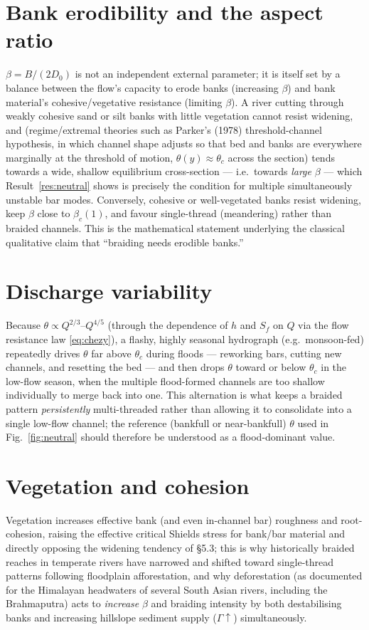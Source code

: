 \documentclass[11pt,a4paper]{report}
\theoremstyle{definition}
\theoremstyle{plain}
\theoremstyle{remark}
\begin{document}
\section{Bank erodibility and the aspect ratio}
$\beta=B/(2D_0)$ is not an independent external parameter; it is itself set by a balance between the flow's capacity to erode banks (increasing $\beta$) and bank material's cohesive/vegetative resistance (limiting $\beta$). A river cutting through weakly cohesive sand or silt banks with little vegetation cannot resist widening, and (regime/extremal theories such as Parker's (1978) threshold-channel hypothesis, in which channel shape adjusts so that bed and banks are everywhere marginally at the threshold of motion, $\theta(y)\approx\theta_c$ across the section) tends towards a wide, shallow equilibrium cross-section — i.e.\ towards \emph{large} $\beta$ — which Result~\ref{res:neutral} shows is precisely the condition for multiple simultaneously unstable bar modes. Conversely, cohesive or well-vegetated banks resist widening, keep $\beta$ close to $\beta_c(1)$, and favour single-thread (meandering) rather than braided channels. This is the mathematical statement underlying the classical qualitative claim that ``braiding needs erodible banks.''

\section{Discharge variability}
Because $\theta\propto Q^{2/3}$--$Q^{4/5}$ (through the dependence of $h$ and $S_f$ on $Q$ via the flow resistance law \eqref{eq:chezy}), a flashy, highly seasonal hydrograph (e.g.\ monsoon-fed) repeatedly drives $\theta$ far above $\theta_c$ during floods --- reworking bars, cutting new channels, and resetting the bed --- and then drops $\theta$ toward or below $\theta_c$ in the low-flow season, when the multiple flood-formed channels are too shallow individually to merge back into one. This alternation is what keeps a braided pattern \emph{persistently} multi-threaded rather than allowing it to consolidate into a single low-flow channel; the reference (bankfull or near-bankfull) $\theta$ used in Fig.~\ref{fig:neutral} should therefore be understood as a flood-dominant value.

\section{Vegetation and cohesion}
Vegetation increases effective bank (and even in-channel bar) roughness and root-cohesion, raising the effective critical Shields stress for bank/bar material and directly opposing the widening tendency of \S 5.3; this is why historically braided reaches in temperate rivers have narrowed and shifted toward single-thread patterns following floodplain afforestation, and why deforestation (as documented for the Himalayan headwaters of several South Asian rivers, including the Brahmaputra) acts to \emph{increase} $\beta$ and braiding intensity by both destabilising banks and increasing hillslope sediment supply ($\Gamma\uparrow$) simultaneously.
\end{document}
